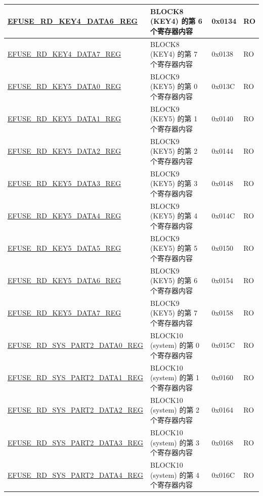 \begin{longtable}{ | p{6cm} | p{7.2cm} | p{1.3cm} | p{1cm} | }
\hyperref[regdesc:EFUSERDKEY4DATA6REG]{EFUSE\_RD\_KEY4\_DATA6\_REG} & BLOCK8 (KEY4) 的第 6 个寄存器内容  & 0x0134 & RO \\ \hline
\hyperref[regdesc:EFUSERDKEY4DATA7REG]{EFUSE\_RD\_KEY4\_DATA7\_REG} & BLOCK8 (KEY4) 的第 7 个寄存器内容  & 0x0138 & RO \\ \hline
\hyperref[regdesc:EFUSERDKEY5DATA0REG]{EFUSE\_RD\_KEY5\_DATA0\_REG} & BLOCK9 (KEY5) 的第 0 个寄存器内容  & 0x013C & RO \\ \hline
\hyperref[regdesc:EFUSERDKEY5DATA1REG]{EFUSE\_RD\_KEY5\_DATA1\_REG} & BLOCK9 (KEY5) 的第 1 个寄存器内容  & 0x0140 & RO \\ \hline
\hyperref[regdesc:EFUSERDKEY5DATA2REG]{EFUSE\_RD\_KEY5\_DATA2\_REG} & BLOCK9 (KEY5) 的第 2 个寄存器内容  & 0x0144 & RO \\ \hline
\hyperref[regdesc:EFUSERDKEY5DATA3REG]{EFUSE\_RD\_KEY5\_DATA3\_REG} & BLOCK9 (KEY5) 的第 3 个寄存器内容  & 0x0148 & RO \\ \hline
\hyperref[regdesc:EFUSERDKEY5DATA4REG]{EFUSE\_RD\_KEY5\_DATA4\_REG} & BLOCK9 (KEY5) 的第 4 个寄存器内容  & 0x014C & RO \\ \hline
\hyperref[regdesc:EFUSERDKEY5DATA5REG]{EFUSE\_RD\_KEY5\_DATA5\_REG} & BLOCK9 (KEY5) 的第 5 个寄存器内容  & 0x0150 & RO \\ \hline
\hyperref[regdesc:EFUSERDKEY5DATA6REG]{EFUSE\_RD\_KEY5\_DATA6\_REG} & BLOCK9 (KEY5) 的第 6 个寄存器内容  & 0x0154 & RO \\ \hline
\hyperref[regdesc:EFUSERDKEY5DATA7REG]{EFUSE\_RD\_KEY5\_DATA7\_REG} & BLOCK9 (KEY5) 的第 7 个寄存器内容  & 0x0158 & RO \\ \hline
\hyperref[regdesc:EFUSERDSYSPART2DATA0REG]{EFUSE\_RD\_SYS\_PART2\_DATA0\_REG} & BLOCK10 (system) 的第 0 个寄存器内容  & 0x015C & RO \\ \hline
\hyperref[regdesc:EFUSERDSYSPART2DATA1REG]{EFUSE\_RD\_SYS\_PART2\_DATA1\_REG} & BLOCK10 (system) 的第 1 个寄存器内容  & 0x0160 & RO \\ \hline
\hyperref[regdesc:EFUSERDSYSPART2DATA2REG]{EFUSE\_RD\_SYS\_PART2\_DATA2\_REG} & BLOCK10 (system) 的第 2 个寄存器内容  & 0x0164 & RO \\ \hline
\hyperref[regdesc:EFUSERDSYSPART2DATA3REG]{EFUSE\_RD\_SYS\_PART2\_DATA3\_REG} & BLOCK10 (system) 的第 3 个寄存器内容  & 0x0168 & RO \\ \hline
\hyperref[regdesc:EFUSERDSYSPART2DATA4REG]{EFUSE\_RD\_SYS\_PART2\_DATA4\_REG} & BLOCK10 (system) 的第 4 个寄存器内容  & 0x016C & RO \\ \hline

\end{longtable}

